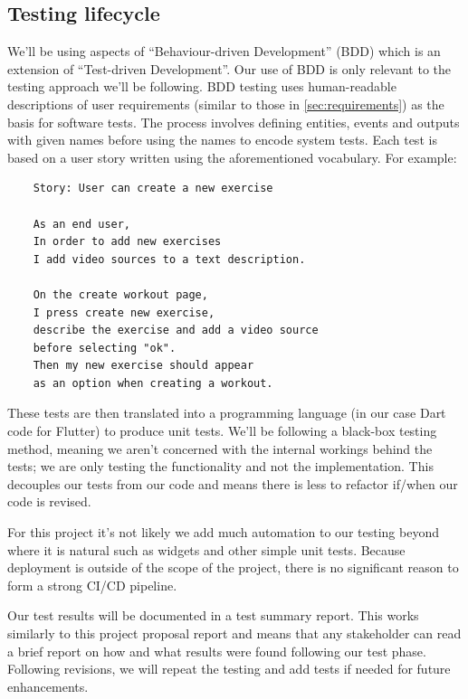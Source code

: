 \subsection{Testing lifecycle}
We'll be using aspects of ``Behaviour-driven Development'' (BDD) which is an extension of
``Test-driven Development''. Our use of BDD is only relevant to the testing approach we'll be following.
BDD testing uses human-readable descriptions of user requirements (similar to those in \cref{sec:requirements}) as the
basis for software tests. The process involves defining entities, events and outputs with given names before using
the names to encode system tests. Each test is based on a user story written using the aforementioned vocabulary.
For example:
\vspace{-5mm}
\begin{verbatim}
    Story: User can create a new exercise

    As an end user,
    In order to add new exercises
    I add video sources to a text description.

    On the create workout page,
    I press create new exercise,
    describe the exercise and add a video source
    before selecting "ok".
    Then my new exercise should appear
    as an option when creating a workout.
\end{verbatim}
\vspace{-5mm}
These tests are then translated into a programming language (in our case Dart code for Flutter)
to produce unit tests. We'll be following a black-box testing method, meaning
we aren't concerned with the internal workings behind the tests; we are only 
testing the functionality and not the implementation. This decouples
our tests from our code and means there is less to refactor if/when our code
is revised.
\par
For this project it's not likely we add much automation to our testing beyond where it is natural
such as widgets and other simple unit tests. Because deployment is outside of the scope of the project,
there is no significant reason to form a strong CI/CD pipeline.
\par
Our test results will be documented in a test summary report. This works similarly to this 
project proposal report and means that any stakeholder can read a brief report on how and what results were
found following our test phase. Following revisions, we will repeat the testing and add tests
if needed for future enhancements.

